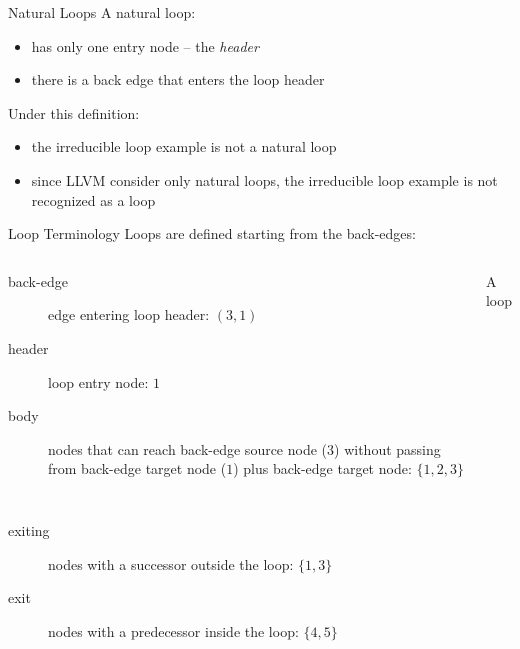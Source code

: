 \begin{frame}{Natural Loops}
A natural loop:

\begin{itemize}
\item has only one entry node -- the \emph{header}
\item there is a back edge that enters the loop header
\end{itemize}

\vfill
Under this definition:

\begin{itemize}
\item the irreducible loop example is not a natural loop
\item since LLVM consider only natural loops, the irreducible loop example \alert{is not
      recognized} as a loop
\end{itemize}
\end{frame}


\begin{frame}{Loop Terminology}
Loops are defined starting from the back-edges:

\begin{columns}[t]

\begin{description}
\item[back-edge] edge entering loop header: $(3,1)$
\item[header] loop entry node: $1$
\item[body] nodes that can reach back-edge source node ($3$) without passing
            from back-edge target node ($1$) plus back-edge target node:
            $\{1 ,2, 3\}$
\end{description}

\begin{block}{\small A loop}

\end{block}

\end{columns}

\begin{description}
\item[exiting] nodes with a successor outside the loop: $\{1, 3\}$
\item[exit] nodes with a predecessor inside the loop: $\{4, 5\}$
\end{description}
\end{frame}


